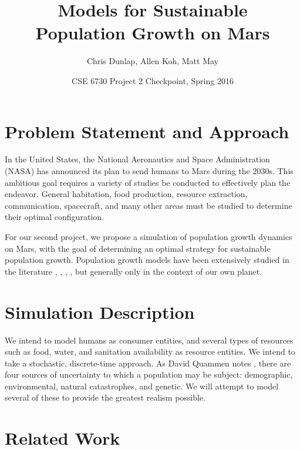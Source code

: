 \documentclass[12pt]{article}
\title{Models for Sustainable \\Population Growth on Mars}
\author{Chris Dunlap, Allen Koh, Matt May}
\date{CSE 6730 Project 2 Checkpoint, Spring 2016}
\begin{document}
\begin{titlepage}
  \maketitle
  \thispagestyle{empty}
\end{titlepage}

\newpage
  \tableofcontents
  \thispagestyle{empty}
\newpage

\section{Problem Statement and Approach}
\label{sec:problem}

In the United States, the National Aeronautics and Space Administration (NASA)
has announced its plan to send humans to Mars during the 2030s. This ambitious
goal requires a variety of studies be conducted to effectively plan the
endeavor. General habitation, food production, resource extraction,
communication, spacecraft, and many other areas must be studied to determine
their optimal configuration.

For our second project, we propose a simulation of population growth dynamics on
Mars, with the goal of determining an optimal strategy for sustainable
population growth. Population growth models have been extensively studied in the
literature \cite{clark1967population}, \cite{caswell2001matrix},
\cite{meadows1992beyond}, \cite{boserup1983population},
\cite{ehrlich1971impact} but generally only in the context of our own planet.

\section{Simulation Description}
\label{sec:simdescrip}

We intend to model humans as consumer entities, and several
types of resources such as food, water, and sanitation availability as resource
entities. We intend to take a stochastic, discrete-time approach. As David
Quammen notes \cite{quammen1996song}, there are four sources of uncertainty to
which a population may be subject: demographic, environmental, natural
catastrophes, and genetic. We will attempt to model several of these to
provide the greatest realism possible.

\section{Related Work}
\label{sec:relatedwork}
\end{document}
